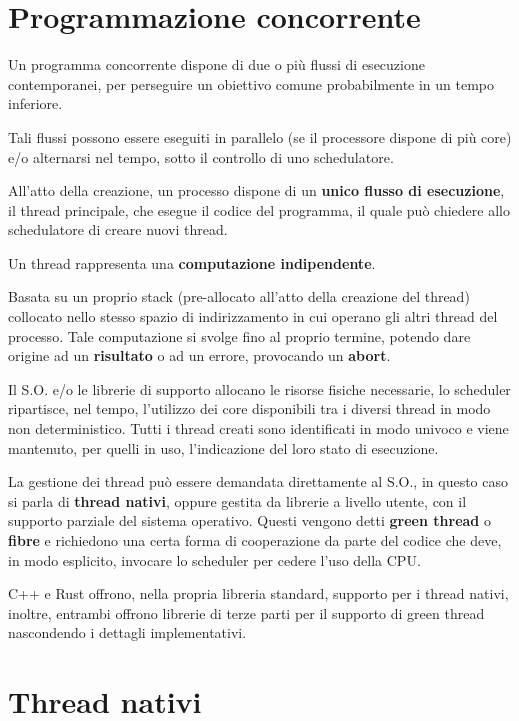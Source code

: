 \section{Programmazione concorrente}

Un programma concorrente dispone di due o più flussi di esecuzione contemporanei,
per perseguire un obiettivo comune probabilmente in un tempo inferiore.

Tali flussi possono essere eseguiti in
parallelo (se il processore dispone di più core) e/o alternarsi nel tempo, sotto
il controllo di uno schedulatore.

All'atto della creazione, un processo dispone di un \textbf{unico flusso di esecuzione},
il thread principale, che esegue il codice del programma, il quale può
chiedere allo schedulatore di creare nuovi thread.

Un thread rappresenta una \textbf{computazione indipendente}.

Basata su un proprio stack (pre-allocato all'atto della creazione del thread)
collocato nello stesso spazio di indirizzamento in cui operano gli altri thread
del processo. Tale computazione si svolge fino al proprio termine, potendo dare
origine ad un \textbf{risultato} o ad un errore, provocando un \textbf{abort}.

Il S.O. e/o le librerie di supporto allocano le risorse fisiche necessarie,
lo scheduler ripartisce, nel tempo, l'utilizzo dei core disponibili tra i
diversi thread in modo non deterministico. Tutti i thread creati sono
identificati in modo univoco e viene mantenuto, per quelli in uso, l'indicazione
del loro stato di esecuzione.

La gestione dei thread può essere demandata direttamente al S.O., in questo caso
si parla di \textbf{thread nativi}, oppure gestita da librerie a livello utente,
con il supporto parziale del sistema operativo.
Questi vengono detti \textbf{green thread} o \textbf{fibre} e richiedono una
certa forma di cooperazione da parte del codice che deve, in modo esplicito,
invocare lo scheduler per cedere l'uso della CPU.

C++ e Rust offrono, nella propria libreria standard, supporto per i thread nativi,
inoltre, entrambi offrono librerie di terze parti per il supporto di green thread
nascondendo i dettagli implementativi.

\section{Thread nativi}

